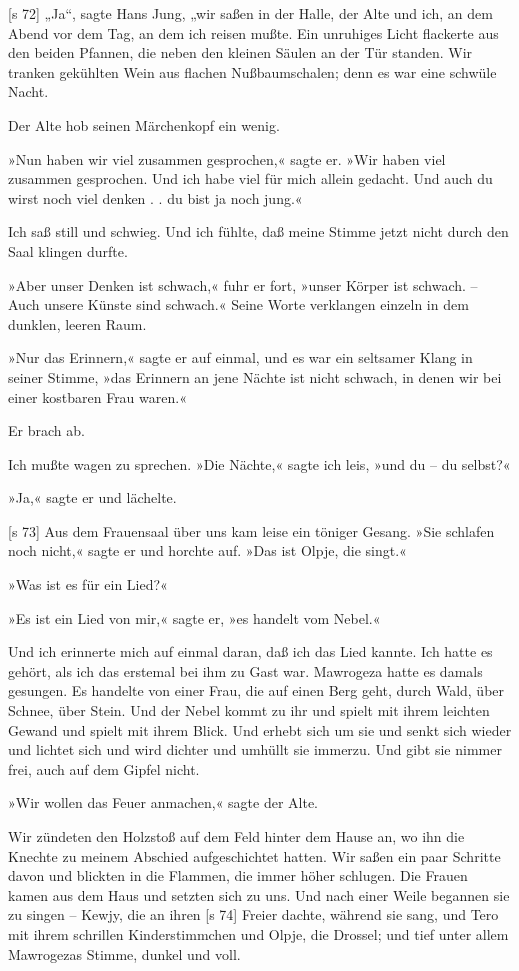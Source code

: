 [s 72]
„Ja“, sagte Hans Jung, „wir saßen in der Halle,
der Alte und ich, an dem Abend vor dem Tag, an
dem ich reisen mußte. Ein unruhiges Licht flackerte
aus den beiden Pfannen, die neben den kleinen Säulen
an der Tür standen. Wir tranken gekühlten Wein
aus flachen Nußbaumschalen; denn es war eine
schwüle Nacht.

Der Alte hob seinen Märchenkopf ein wenig.

»Nun haben wir viel zusammen gesprochen,«
sagte er. »Wir haben viel zusammen gesprochen.
Und ich habe viel für mich allein gedacht. Und auch
du wirst noch viel denken . . du bist ja noch jung.«

Ich saß still und schwieg. Und ich fühlte, daß
meine Stimme jetzt nicht durch den Saal klingen durfte.

»Aber unser Denken ist schwach,« fuhr er fort,
»unser Körper ist schwach. – Auch unsere Künste
sind schwach.« Seine Worte verklangen einzeln in
dem dunklen, leeren Raum.

»Nur das Erinnern,« sagte er auf einmal, und
es war ein seltsamer Klang in seiner Stimme, »das
Erinnern an jene Nächte ist nicht schwach, in denen
wir bei einer kostbaren Frau waren.«

Er brach ab.

Ich mußte wagen zu sprechen. »Die Nächte,«
sagte ich leis, »und du – du selbst?«

»Ja,« sagte er und lächelte.

[s 73]
Aus dem Frauensaal über uns kam leise ein­
töniger Gesang. »Sie schlafen noch nicht,« sagte er
und horchte auf. »Das ist Olpje, die singt.«

»Was ist es für ein Lied?«

»Es ist ein Lied von mir,« sagte er, »es handelt
vom Nebel.«

Und ich erinnerte mich auf einmal daran, daß
ich das Lied kannte. Ich hatte es gehört, als ich
das erstemal bei ihm zu Gast war. Mawrogeza
hatte es damals gesungen. Es handelte von einer
Frau, die auf einen Berg geht, durch Wald, über
Schnee, über Stein. Und der Nebel kommt zu ihr und
spielt mit ihrem leichten Gewand und spielt mit ihrem
Blick. Und erhebt sich um sie und senkt sich wieder
und lichtet sich und wird dichter und umhüllt sie
immerzu. Und gibt sie nimmer frei, auch auf dem
Gipfel nicht.

»Wir wollen das Feuer anmachen,« sagte der
Alte.

Wir zündeten den Holzstoß auf dem Feld hinter
dem Hause an, wo ihn die Knechte zu meinem
Abschied aufgeschichtet hatten. Wir saßen ein paar
Schritte davon und blickten in die Flammen, die
immer höher schlugen. Die Frauen kamen aus dem
Haus und setzten sich zu uns. Und nach einer
Weile begannen sie zu singen – Kewjy, die an ihren
[s 74]
Freier dachte, während sie sang, und Tero mit ihrem
schrillen Kinderstimmchen und Olpje, die Drossel;
und tief unter allem Mawrogezas Stimme, dunkel
und voll.

